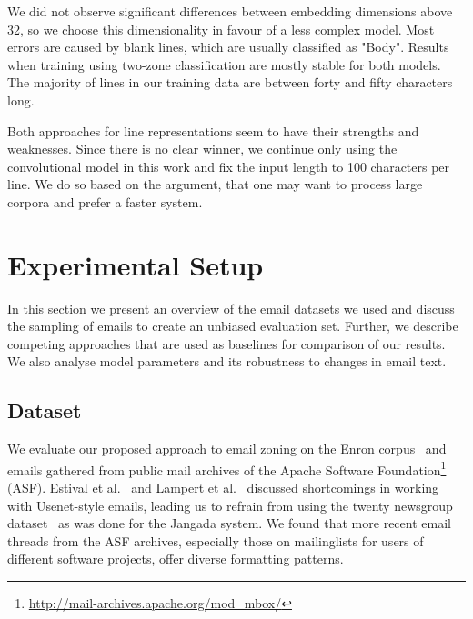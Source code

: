 \documentclass{llncs}
\begin{document}
We did not observe significant differences between embedding dimensions above 32, so we choose this dimensionality in favour of a less complex model.
Most errors are caused by blank lines, which are usually classified as "Body".
Results when training using two-zone classification are mostly stable for both models.
The majority of lines in our training data are between forty and fifty characters long.

Both approaches for line representations seem to have their strengths and weaknesses.
Since there is no clear winner, we continue only using the convolutional model in this work and fix the input length to 100 characters per line.
We do so based on the argument, that one may want to process large corpora and prefer a faster system.




\section{Experimental Setup}
In this section we present an overview of the email datasets we used and discuss the sampling of emails to create an unbiased evaluation set.
Further, we describe competing approaches that are used as baselines for comparison of our results.
We also analyse model parameters and its robustness to changes in email text.

\subsection{Dataset}
We evaluate our proposed approach to email zoning on the Enron corpus~\cite{enron} and emails gathered from public mail archives of the Apache Software Foundation\footnote{\url{http://mail-archives.apache.org/mod\_mbox/}} (ASF). 
Estival et al.~\cite{profiling} and Lampert et al.~\cite{zones} discussed shortcomings in working with Usenet-style emails, leading us to refrain from using the twenty newsgroup dataset~\cite{20news} as was done for the Jangada system.
We found that more recent email threads from the ASF archives, especially those on mailinglists for users of different software projects, offer diverse formatting patterns.
\end{document}
